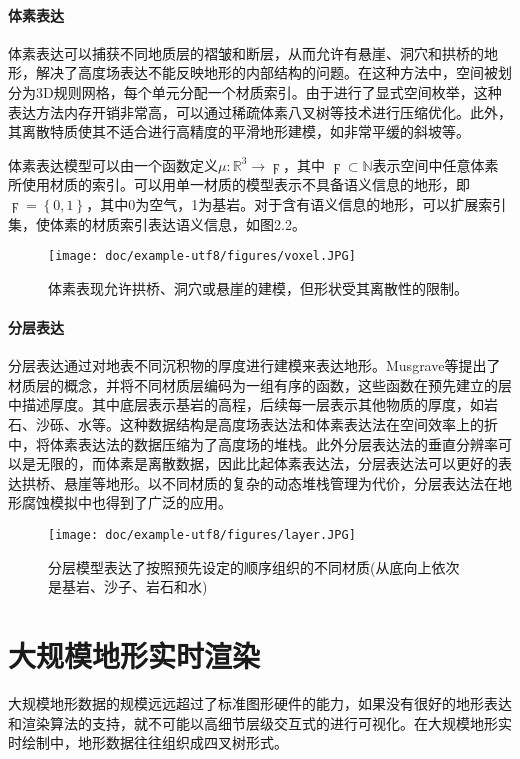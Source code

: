 \paragraph{体素表达}
体素表达可以捕获不同地质层的褶皱和断层，从而允许有悬崖、洞穴和拱桥的地形，解决了高度场表达不能反映地形的内部结构的问题。在这种方法中，空间被划分为3D规则网格，每个单元分配一个材质索引。由于进行了显式空间枚举，这种表达方法内存开销非常高，可以通过稀疏体素八叉树等技术进行压缩优化。此外，其离散特质使其不适合进行高精度的平滑地形建模，如非常平缓的斜坡等。\par
体素表达模型可以由一个函数定义$\mu:\mathbb{R}^3\to \digamma$，其中 $\digamma\subset\mathbb{N}$表示空间中任意体素所使用材质的索引。可以用单一材质的模型表示不具备语义信息的地形，即$\digamma=\left\{0,1\right\}$，其中0为空气，1为基岩。对于含有语义信息的地形，可以扩展索引集，使体素的材质索引表达语义信息，如图2.2。
\begin{figure}[htbp]
\centering
\texttt{[image: doc/example-utf8/figures/voxel.JPG]}
\caption{体素表现允许拱桥、洞穴或悬崖的建模，但形状受其离散性的限制。\supercite{eric-review}}
\end{figure}

\paragraph{分层表达}
分层表达通过对地表不同沉积物的厚度进行建模来表达地形。Musgrave等\supercite{Musgrave1998The}提出了材质层的概念，并将不同材质层编码为一组有序的函数，这些函数在预先建立的层中描述厚度。其中底层表示基岩的高程，后续每一层表示其他物质的厚度，如岩石、沙砾、水等。这种数据结构是高度场表达法和体素表达法在空间效率上的折中，将体素表达法的数据压缩为了高度场的堆栈。此外分层表达法的垂直分辨率可以是无限的，而体素是离散数据，因此比起体素表达法，分层表达法可以更好的表达拱桥、悬崖等地形。以不同材质的复杂的动态堆栈管理为代价，分层表达法在地形腐蚀模拟中也得到了广泛的应用。
\begin{figure}[h]
\centering
\texttt{[image: doc/example-utf8/figures/layer.JPG]}
\caption{分层模型表达了按照预先设定的顺序组织的不同材质(从底向上依次是基岩、沙子、岩石和水)\supercite{eric-review}}
\end{figure}

\section{大规模地形实时渲染}
大规模地形数据的规模远远超过了标准图形硬件的能力，如果没有很好的地形表达和渲染算法的支持，就不可能以高细节层级交互式的进行可视化。在大规模地形实时绘制中，地形数据往往组织成四叉树形式。\supercite{Pajarola1998Large}
